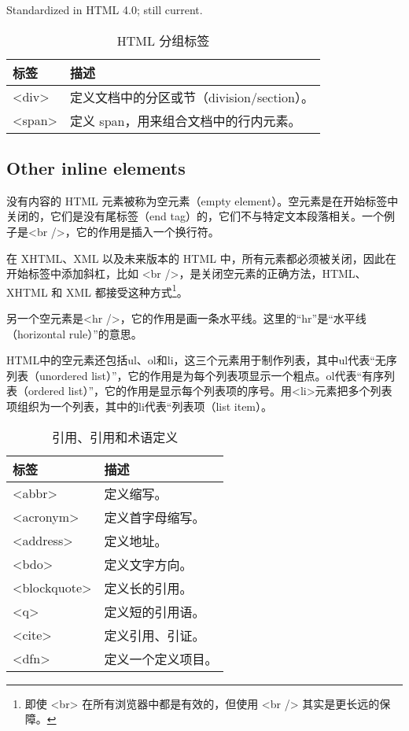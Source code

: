 Standardized in HTML 4.0; still current.


\begin{table}
\centering
\caption{HTML 分组标签}
\begin{tabular}{|l|l|}
\hline
标签		&描述\\
\hline
<div>	&定义文档中的分区或节（division/section）。\\
\hline
<span>	&定义 span，用来组合文档中的行内元素。\\
\hline
\end{tabular}
\end{table}




\subsection{Other inline elements}

没有内容的 HTML 元素被称为空元素（empty element）。空元素是在开始标签中关闭的，它们是没有尾标签（end tag）的，它们不与特定文本段落相关。一个例子是<br />，它的作用是插入一个换行符。

在 XHTML、XML 以及未来版本的 HTML 中，所有元素都必须被关闭，因此在开始标签中添加斜杠，比如 <br />，是关闭空元素的正确方法，HTML、XHTML 和 XML 都接受这种方式\footnote{即使 <br> 在所有浏览器中都是有效的，但使用 <br /> 其实是更长远的保障。}。

另一个空元素是<hr />，它的作用是画一条水平线。这里的“hr”是“水平线（horizontal rule）”的意思。

HTML中的空元素还包括ul、ol和li，这三个元素用于制作列表，其中ul代表“无序列表（unordered list）”，它的作用是为每个列表项显示一个粗点。ol代表“有序列表（ordered list）”，它的作用是显示每个列表项的序号。用<li>元素把多个列表项组织为一个列表，其中的li代表“列表项（list item）。

\begin{table}[!h]
\centering
\caption{引用、引用和术语定义}
\begin{tabular}{|l|l|}
\hline
标签		&描述			\\
\hline
<abbr>	&定义缩写。		\\
\hline
<acronym>&定义首字母缩写。\\
\hline
<address>&定义地址。		\\
\hline
<bdo>	&定义文字方向。	\\
\hline
<blockquote>&定义长的引用。\\
\hline
<q>		&定义短的引用语。\\
\hline
<cite>	&定义引用、引证。\\
\hline
<dfn>	&定义一个定义项目。\\
\hline
\end{tabular}
\end{table}

